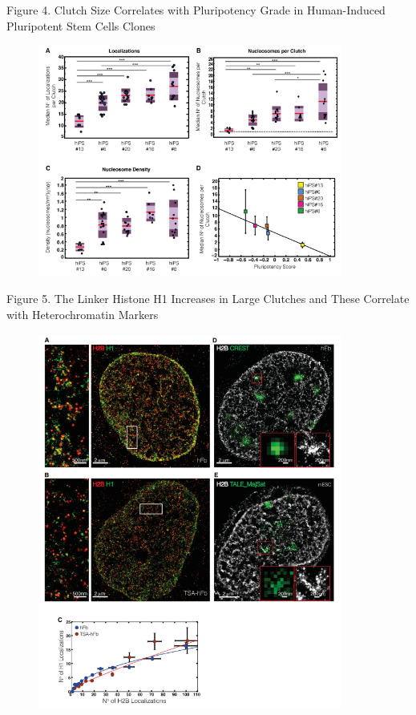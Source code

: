 \documentclass{beamer}			%
\begin{document}
\begin{frame}{Figure 4. Clutch Size Correlates with Pluripotency Grade in Human-Induced Pluripotent Stem Cells Clones}
\begin{figure}
\includegraphics[width=10cm]{Figure-4.png}
\end{figure}
\end{frame}

\begin{frame}{Figure 5. The Linker Histone H1 Increases in Large Clutches and These Correlate with Heterochromatin Markers}
\begin{figure}
\includegraphics[width=10cm]{Figure-5.png}
\end{figure}
\end{frame}
\end{document}
